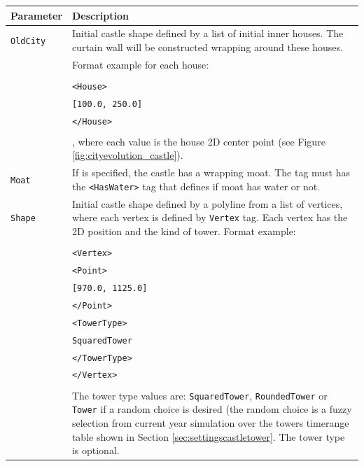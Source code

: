 \documentclass[tog]{acmsiggraph}
\begin{document}
\begin{tabularx}{0.48\textwidth}{ |l|X| }
\hline 
\textbf{Parameter} & \textbf{Description} \\[0.15cm]
 \hline
 \texttt{OldCity} & Initial castle shape defined by a list of initial inner houses. The curtain wall will be constructed wrapping around these houses. \\
 & Format example for each house:\\
 & \\
 & \quad\texttt{<House>}\\
 & \quad\quad\texttt{[100.0, 250.0]}\\
 & \quad\texttt{</House>}\\
  & \\
 & , where each value is the house 2D center point (see Figure \ref{fig:cityevolution_castle}).\\
 \hline
 \texttt{Moat} & If is specified, the castle has a wrapping moat. The tag must has the \texttt{<HasWater>} tag that defines if moat has water or not.\\
 \hline
 \texttt{Shape} & Initial castle shape defined by a polyline from a list of vertices, where each vertex is defined by \texttt{Vertex} tag. Each vertex has the 2D position and the kind of tower. Format example:\\
 & \\
 & \quad\texttt{<Vertex>}\\
 & \quad\quad\texttt{<Point>}\\
 & \quad\quad\quad\texttt{[970.0, 1125.0]}\\
 & \quad\quad\texttt{</Point>}\\
 & \quad\quad\texttt{<TowerType>}\\
 & \quad\quad\quad\texttt{SquaredTower}\\
 & \quad\quad\texttt{</TowerType>}\\
 & \quad\texttt{</Vertex>}\\
 & \\
 & The tower type values are: \texttt{SquaredTower}, \texttt{RoundedTower} or \texttt{Tower} if a random choice is desired (the random choice is a fuzzy selection from current year simulation over the towers timerange table shown in Section \ref{sec:settingscastletower}. The tower type is optional.\\
 \hline
\end{tabularx} 
\end{document}
